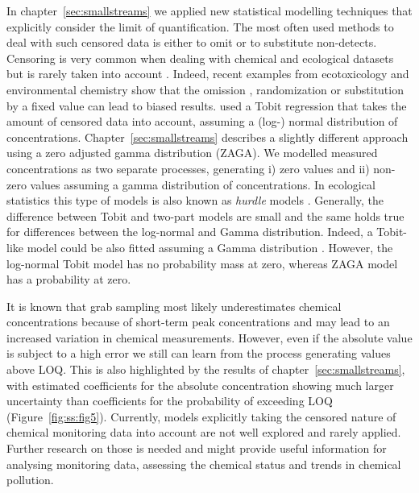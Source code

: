 In chapter~\ref{sec:smallstreams} we applied new statistical modelling techniques that explicitly consider the limit of quantification.
The most often used methods to deal with such censored data is either to omit or to substitute non-detects. 
Censoring is very common when dealing with chemical and ecological datasets but is rarely taken into account \citep{fox_ecological_2015}. 
Indeed, recent examples from ecotoxicology and environmental chemistry show that the omission \citep{hansen_re-evaluation_2015}, randomization \citep{goulson_neonicotinoids_2015} or substitution by a fixed value \citep{helsel_much_2010, helsel_fabricating_2006} can lead to biased results.
\citet{hansen_re-evaluation_2015} used a Tobit regression \citep{tobin_estimation_1958} that takes the amount of censored data into account, assuming a (log-) normal distribution of concentrations.
Chapter~\ref{sec:smallstreams} describes a slightly different approach using a zero adjusted gamma distribution (ZAGA).
We modelled measured concentrations as two separate processes, generating i) zero values and ii) non-zero values assuming a gamma distribution of concentrations.
In ecological statistics this type of models is also known as \emph{hurdle} models \citep{martin_zero_2005}. 
Generally, the difference between Tobit and two-part models are small \citep{min_modeling_2002} and the same holds true for differences between the log-normal and Gamma distribution. 
Indeed, a Tobit-like model could be also fitted assuming a Gamma distribution \citep{sigrist_using_2010}.
However, the log-normal Tobit model has no probability mass at zero, whereas ZAGA model has a probability at zero. 

It is known that grab sampling most likely underestimates chemical concentrations because of short-term peak concentrations \citep{xing_influences_2013, stehle_probabilistic_2013} and may lead to an increased variation in chemical measurements.
However, even if the absolute value is subject to a high error we still can learn from the process generating values above LOQ.
This is also highlighted by the results of chapter~\ref{sec:smallstreams}, with estimated coefficients for the absolute concentration showing much larger uncertainty than coefficients for the probability of exceeding LOQ (Figure~\ref{fig:ss:fig5}). 
Currently, models explicitly taking the censored nature of chemical monitoring data into account are not well explored and rarely applied.
Further research on those is needed and might provide useful information for analysing monitoring data, assessing the chemical status and trends in chemical pollution.



